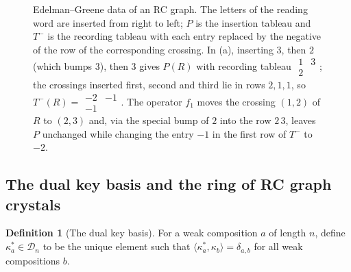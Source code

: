 \documentclass{amsart}
\newtheorem{theorem}{Theorem}[section]
\theoremstyle{definition}
\newtheorem{definition}[lemma]{Definition}
\theoremstyle{remark}
\numberwithin{equation}{subsection}
\newcommand{\RC}{\mathcal{RC}}
\newcommand{\dcoma}{\mathcal{D}}
\begin{document}
\begin{figure}[htbp]
\begin{minipage}{0.48\textwidth}
\end{minipage}
\caption{Edelman--Greene data of an RC graph. The letters of the reading word are inserted from right to left; $P$ is the insertion tableau and $T^-$ is the recording tableau with each entry replaced by the negative of the row of the corresponding crossing. In (a), inserting $3$, then $2$ (which bumps $3$), then $3$ gives $P(R)$ with recording tableau $\begin{smallmatrix}1&3\\2\end{smallmatrix}$; the crossings inserted first, second and third lie in rows $2,1,1$, so $T^-(R)=\begin{smallmatrix}-2&-1\\-1\end{smallmatrix}$. The operator $f_1$ moves the crossing $(1,2)$ of $R$ to $(2,3)$ and, via the special bump of $2$ into the row $2\,3$, leaves $P$ unchanged while changing the entry $-1$ in the first row of $T^-$ to $-2$.}
\label{fig:egexample}
\end{figure}

\subsection{The dual key basis and the ring of RC graph crystals}

\begin{definition}[The dual key basis]
  For a weak composition $a$ of length $n$, define $\kappa_a^*\in \dcoma_n$ to be the unique element such that $\langle \kappa_a^*, \kappa_b\rangle = \delta_{a,b}$ for all weak compositions $b$.
\end{definition}




\end{document}
